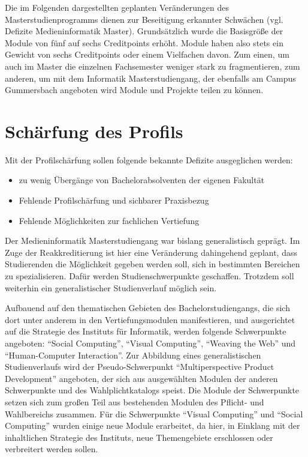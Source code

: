 Die im Folgenden dargestellten geplanten Veränderungen des
Masterstudienprogramms dienen zur Beseitigung erkannter Schwächen (vgl.
Defizite Medieninformatik Master). Grundsätzlich wurde die Basisgröße
der Module von fünf auf sechs Creditpoints erhöht. Module haben also
stets ein Gewicht von sechs Creditpoints oder einem Vielfachen davon.
Zum einen, um auch im Master die einzelnen Fachsemester weniger stark zu
fragmentieren, zum anderen, um mit dem Informatik Masterstudiengang, der
ebenfalls am Campus Gummersbach angeboten wird Module und Projekte
teilen zu können.

\section{Schärfung des Profils}\label{schuxe4rfung-des-profils}

Mit der Profilschärfung sollen folgende bekannte Defizite ausgeglichen
werden:

\begin{itemize}
\tightlist
\item
  zu wenig Übergänge von Bachelorabsolventen der eigenen Fakultät
\item
  Fehlende Profilschärfung und sichbarer Praxisbezug
\item
  Fehlende Möglichkeiten zur fachlichen Vertiefung
\end{itemize}

Der Medieninformatik Masterstudiengang war bislang generalistisch
geprägt. Im Zuge der Reakkreditierung ist hier eine Veränderung
dahingehend geplant, dass Studierenden die Möglichkeit gegeben werden
soll, sich in bestimmten Bereichen zu spezialisieren. Dafür werden
Studienschwerpunkte geschaffen. Trotzdem soll weiterhin ein
generalistischer Studienverlauf möglich sein.

Aufbauend auf den thematischen Gebieten des Bachelorstudiengangs, die
sich dort unter anderem in den Vertiefungsmodulen manifestieren, und
ausgerichtet auf die Strategie des Instituts für Informatik, werden
folgende Schwerpunkte angeboten: ``Social Computing'', ``Visual
Computing'', ``Weaving the Web'' und ``Human-Computer Interaction''. Zur
Abbildung eines generalistischen Studienverlaufs wird der
Pseudo-Schwerpunkt ``Multiperspective Product Development'' angeboten,
der sich aus ausgewählten Modulen der anderen Schwerpunkte und des
Wahlplichtkatalogs speist. Die Module der Schwerpunkte setzen sich zum
großen Teil aus bestehenden Modulen des Pflicht- und Wahlbereichs
zusammen. Für die Schwerpunkte ``Visual Computing'' und ``Social
Computing'' wurden einige neue Module erarbeitet, da hier, in Einklang
mit der inhaltlichen Strategie des Instituts, neue Themengebiete
erschlossen oder verbreitert werden sollen.

